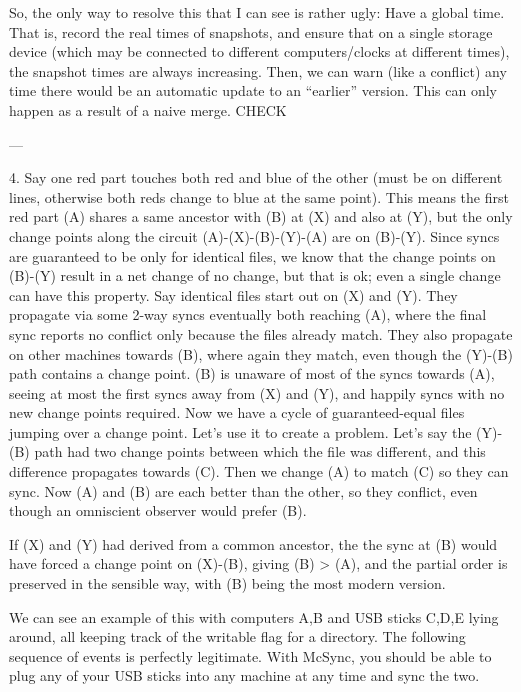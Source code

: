 \documentclass{book}
\begin{document}
So, the only way to resolve this that I can see is rather ugly: Have a global time.  That is, record the real times of snapshots, and ensure that on a single storage device (which may be connected to different computers/clocks at different times), the snapshot times are always increasing.  Then, we can warn (like a conflict) any time there would be an automatic update to an ``earlier'' version.  This can only happen as a result of a naive merge.  CHECK

---

4. Say one red part touches both red and blue of the other (must be on different lines, otherwise both reds change to blue at the same point).  This means the first red part (A) shares a same ancestor with (B) at (X) and also at (Y), but the only change points along the circuit (A)-(X)-(B)-(Y)-(A) are on (B)-(Y).  Since syncs are guaranteed to be only for identical files, we know that the change points on (B)-(Y) result in a net change of no change, but that is ok; even a single change can have this property.  Say identical files start out on (X) and (Y).  They propagate via some 2-way syncs eventually both reaching (A), where the final sync reports no conflict only because the files already match.  They also propagate on other machines towards (B), where again they match, even though the (Y)-(B) path contains a change point.  (B) is unaware of most of the syncs towards (A), seeing at most the first syncs away from (X) and (Y), and happily syncs with no new change points required.  Now we have a cycle of guaranteed-equal files jumping over a change point.  Let's use it to create a problem.  Let's say the (Y)-(B) path had two change points between which the file was different, and this difference propagates towards (C).  Then we change (A) to match (C) so they can sync.  Now (A) and (B) are each better than the other, so they conflict, even though an omniscient observer would prefer (B).

  If (X) and (Y) had derived from a common ancestor, the the sync at (B) would have forced a change point on (X)-(B), giving (B) > (A), and the partial order is preserved in the sensible way, with (B) being the most modern version.

We can see an example of this with computers A,B and USB sticks C,D,E lying around, all keeping track of the writable flag for a directory.  The following sequence of events is perfectly legitimate.  With McSync, you should be able to plug any of your USB sticks into any machine at any time and sync the two.
\end{document}
